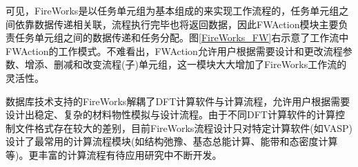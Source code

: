可见，\textrm{FireWorks}是以任务单元组为基本组成的来实现工作流程的，任务单元组之间依靠数据传递相关联，流程执行完毕也将返回数据，因此\textrm{FWAction}模块主要负责任务单元组之间的数据传递和任务分配。图\ref{FireWorks_FW}右示意了工作流中\textrm{FWAction}的工作模式。不难看出，\textrm{FWAction}允许用户根据需要设计和更改流程参数、增添、删减和改变流程(子)单元组，这一模块大大增加了\textrm{FireWorks}工作流的灵活性。

数据库技术支持的\textrm{FireWorks}解耦了\textrm{DFT}计算软件与计算流程，允许用户根据需要设计出稳定、复杂的材料物性模拟与设计流程。由于不同\textrm{DFT}计算软件的计算控制文件格式存在较大的差别，目前\textrm{FireWorks}流程设计只对特定计算软件(如\textrm{VASP})设计了最常用的计算流程模块(如结构弛豫、基态总能计算、能带和态密度计算等)。更丰富的计算流程有待应用研究中不断开发。
